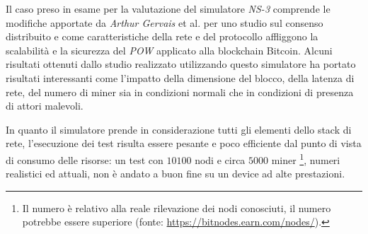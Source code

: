 Il caso preso in esame per la valutazione del simulatore \textit{NS-3} comprende le modifiche apportate da \textit{Arthur Gervais} et al. per uno studio sul consenso distribuito e come caratteristiche della rete e del protocollo affliggono la scalabilità e la sicurezza del \textit{POW} applicato alla blockchain Bitcoin.\newline
Alcuni risultati ottenuti dallo studio realizzato utilizzando questo simulatore ha portato risultati interessanti come l'impatto della dimensione del blocco, della latenza di rete, del numero di miner sia in condizioni normali che in condizioni di presenza di attori malevoli.
\begin{table}[H]
    \centering
    \caption{Numero di blocchi \textit{stale} e transazioni per secondo raggiungibili con 16 miner nella rete e diverse dimensioni dei blocchi}
\end{table}
In quanto il simulatore prende in considerazione tutti gli elementi dello stack di rete, l'esecuzione dei test risulta essere pesante e poco efficiente dal punto di vista di consumo delle risorse: un test con $10100$ nodi e circa $5000$ miner \footnote{Il numero è relativo alla reale rilevazione dei nodi conosciuti, il numero potrebbe essere superiore (fonte: \href{https://bitnodes.earn.com/nodes/}{https://bitnodes.earn.com/nodes/}).}, numeri realistici ed attuali, non è andato a buon fine su un device ad alte prestazioni.\newline
